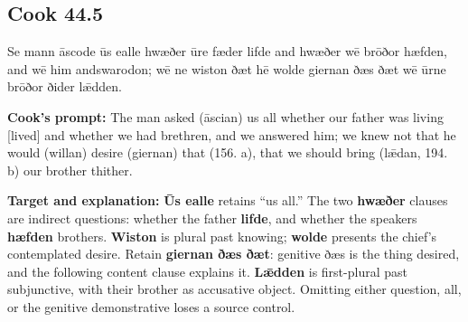 \par\begin{minipage}{\linewidth}\raggedright
\subsection*{Cook 44.5}

Se mann āscode ūs ealle hwæðer ūre fæder lifde and hwæðer wē brōðor hæfden, and wē him andswarodon; wē ne wiston ðæt hē wolde giernan ðæs ðæt wē ūrne brōðor ðider lǣdden.

\textbf{Cook’s prompt:} The man asked (āscian) us all whether our father was living [lived] and whether we had brethren, and we answered him; we knew not that he would (willan) desire (giernan) that (156. a), that we should bring (lǣdan, 194. b) our brother thither.

\textbf{Target and explanation:} \textbf{Ūs ealle} retains “us all.” The two \textbf{hwæðer} clauses are indirect questions: whether the father \textbf{lifde}, and whether the speakers \textbf{hæfden} brothers. \textbf{Wiston} is plural past knowing; \textbf{wolde} presents the chief’s contemplated desire. Retain \textbf{giernan ðæs ðæt}: genitive ðæs is the thing desired, and the following content clause explains it. \textbf{Lǣdden} is first-plural past subjunctive, with their brother as accusative object. Omitting either question, all, or the genitive demonstrative loses a source control.

\end{minipage}\par\addvspace{4pt}

